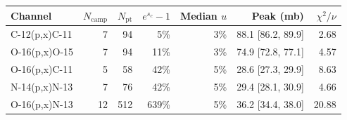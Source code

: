 \begin{tabular}{lrrrrrr}
\toprule
Channel & $N_{\mathrm{camp}}$ & $N_{\mathrm{pt}}$ & $e^{s_c}-1$ & Median $u$ & Peak (mb) & $\chi^2/\nu$ \\
\midrule
C-12(p,x)C-11 & 7 & 94 & 5\% & 3\% & 88.1 [86.2, 89.9] & 2.68 \\
O-16(p,x)O-15 & 7 & 94 & 11\% & 3\% & 74.9 [72.8, 77.1] & 4.57 \\
O-16(p,x)C-11 & 5 & 58 & 42\% & 5\% & 28.6 [27.3, 29.9] & 8.63 \\
N-14(p,x)N-13 & 7 & 76 & 42\% & 5\% & 29.4 [28.1, 30.9] & 4.66 \\
O-16(p,x)N-13 & 12 & 512 & 639\% & 5\% & 36.2 [34.4, 38.0] & 20.88 \\
\bottomrule
\end{tabular}
